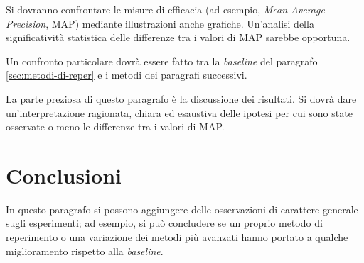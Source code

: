\documentclass{llncs}
\begin{document}
Si dovranno confrontare le misure di efficacia (ad esempio, \textit{Mean Average
  Precision}, MAP) mediante illustrazioni anche grafiche. Un'analisi della
significativit\`a statistica delle differenze tra i valori di MAP sarebbe
opportuna.

Un confronto particolare dovr\`a essere fatto tra la \textit{baseline} del
paragrafo \ref{sec:metodi-di-reper} e i metodi dei paragrafi successivi.

La parte preziosa di questo paragrafo \`e la discussione dei risultati. Si
dovr\`a dare un'interpretazione ragionata, chiara ed esaustiva delle ipotesi per
cui sono state osservate o meno le differenze tra i valori di MAP. 

\section{Conclusioni}
\label{sec:conclusioni}

In questo paragrafo si possono aggiungere delle osservazioni di carattere
generale sugli esperimenti; ad esempio, si pu\`o concludere se un proprio metodo
di reperimento o una variazione dei metodi pi\`u avanzati hanno portato a
qualche miglioramento rispetto alla \textit{baseline}.
\end{document}
